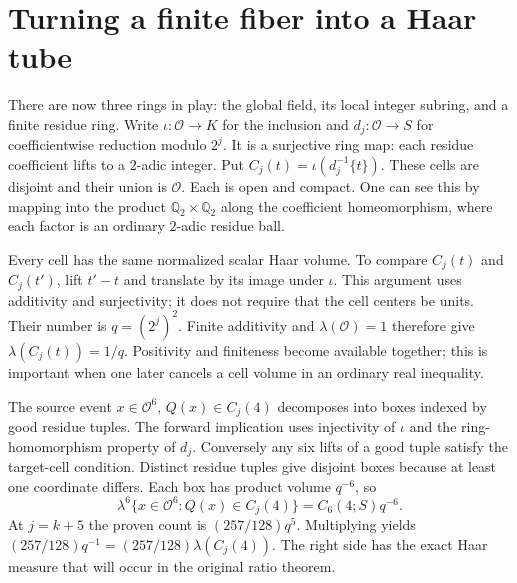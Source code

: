\documentclass[12pt,letterpaper]{article}
\begin{document}
\section{Turning a finite fiber into a Haar tube}
There are now three rings in play: the global field, its local integer subring, and a finite residue ring. Write $\iota:\mathcal O\to K$ for the inclusion and $d_j:\mathcal O\to S$ for coefficientwise reduction modulo $2^j$. It is a surjective ring map: each residue coefficient lifts to a $2$-adic integer. Put $C_j(t)=\iota(d_j^{-1}\{t\})$. These cells are disjoint and their union is $\mathcal O$. Each is open and compact. One can see this by mapping into the product $\mathbb Q_2\times\mathbb Q_2$ along the coefficient homeomorphism, where each factor is an ordinary $2$-adic residue ball.
\par
Every cell has the same normalized scalar Haar volume. To compare $C_j(t)$ and $C_j(t')$, lift $t'-t$ and translate by its image under $\iota$. This argument uses additivity and surjectivity; it does not require that the cell centers be units. Their number is $q=(2^j)^2$. Finite additivity and $\lambda(\mathcal O)=1$ therefore give $\lambda(C_j(t))=1/q$. Positivity and finiteness become available together; this is important when one later cancels a cell volume in an ordinary real inequality.
\par
The source event $x\in\mathcal O^6$, $Q(x)\in C_j(4)$ decomposes into boxes indexed by good residue tuples. The forward implication uses injectivity of $\iota$ and the ring-homomorphism property of $d_j$. Conversely any six lifts of a good tuple satisfy the target-cell condition. Distinct residue tuples give disjoint boxes because at least one coordinate differs. Each box has product volume $q^{-6}$, so
\[
   \lambda^6\{x\in\mathcal O^6: Q(x)\in C_j(4)\}
        =C_6(4;S)q^{-6}.
\]
At $j=k+5$ the proven count is $(257/128)q^5$. Multiplying yields $(257/128)q^{-1}=(257/128)\lambda(C_j(4))$. The right side has the exact Haar measure that will occur in the original ratio theorem.
\end{document}

